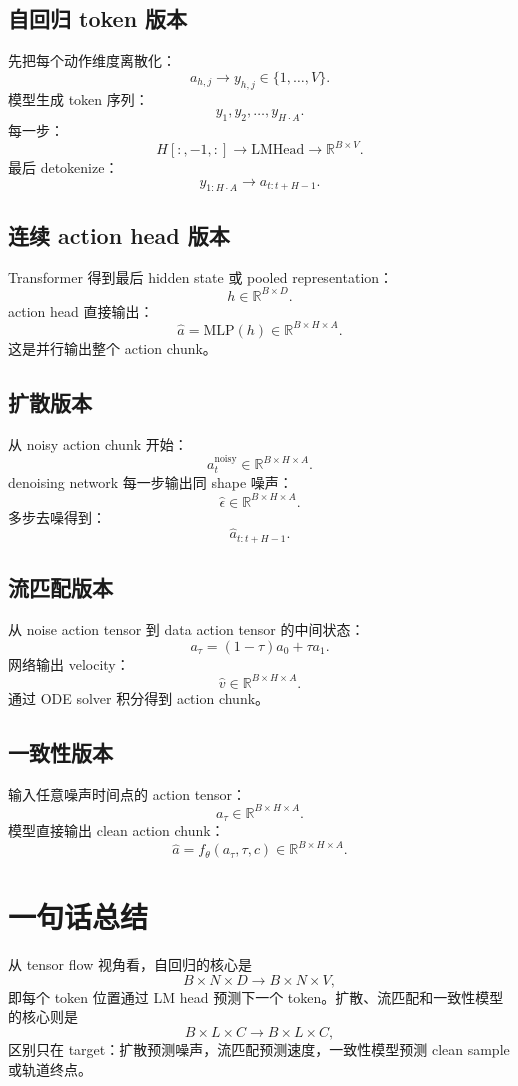 \documentclass[11pt,a4paper]{ctexart}
\begin{document}
\subsection{自回归 token 版本}

先把每个动作维度离散化：
\[
  a_{h,j}\rightarrow y_{h,j}\in\{1,\ldots,V\}.
\]
模型生成 token 序列：
\[
  y_1,y_2,\ldots,y_{H\cdot A}.
\]
每一步：
\[
  H[:,-1,:]\rightarrow \mathrm{LMHead}\rightarrow \mathbb{R}^{B\times V}.
\]
最后 detokenize：
\[
  y_{1:H\cdot A}\rightarrow a_{t:t+H-1}.
\]

\subsection{连续 action head 版本}

Transformer 得到最后 hidden state 或 pooled representation：
\[
  h\in\mathbb{R}^{B\times D}.
\]
action head 直接输出：
\[
  \hat{a}
  =
  \mathrm{MLP}(h)
  \in\mathbb{R}^{B\times H\times A}.
\]
这是并行输出整个 action chunk。

\subsection{扩散版本}

从 noisy action chunk 开始：
\[
  a_t^{\mathrm{noisy}}\in\mathbb{R}^{B\times H\times A}.
\]
denoising network 每一步输出同 shape 噪声：
\[
  \hat{\epsilon}\in\mathbb{R}^{B\times H\times A}.
\]
多步去噪得到：
\[
  \hat{a}_{t:t+H-1}.
\]

\subsection{流匹配版本}

从 noise action tensor 到 data action tensor 的中间状态：
\[
  a_\tau=(1-\tau)a_0+\tau a_1.
\]
网络输出 velocity：
\[
  \hat{v}\in\mathbb{R}^{B\times H\times A}.
\]
通过 ODE solver 积分得到 action chunk。

\subsection{一致性版本}

输入任意噪声时间点的 action tensor：
\[
  a_\tau\in\mathbb{R}^{B\times H\times A}.
\]
模型直接输出 clean action chunk：
\[
  \hat{a}=f_\theta(a_\tau,\tau,c)
  \in\mathbb{R}^{B\times H\times A}.
\]

\section{一句话总结}

从 tensor flow 视角看，自回归的核心是
\[
  B\times N\times D
  \rightarrow
  B\times N\times V,
\]
即每个 token 位置通过 LM head 预测下一个 token。扩散、流匹配和一致性模型的核心则是
\[
  B\times L\times C
  \rightarrow
  B\times L\times C,
\]
区别只在 target：扩散预测噪声，流匹配预测速度，一致性模型预测 clean sample 或轨道终点。
\end{document}
